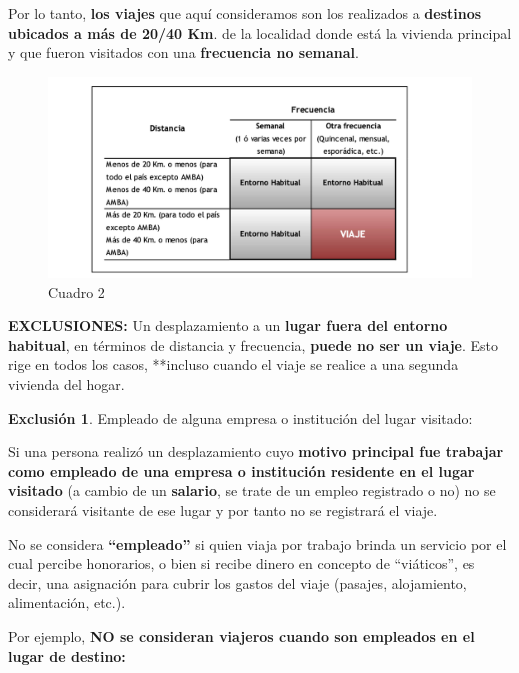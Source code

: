 \documentclass[
  openany]{book}
\begin{document}
Por lo tanto, \textbf{los viajes} que aquí consideramos son los realizados a \textbf{destinos ubicados a más de 20/40 Km}. de la localidad donde está la vivienda principal y que fueron visitados con una \textbf{frecuencia no semanal}.

\begin{figure}

{\centering \includegraphics[width=1\linewidth]{imagenes/figura6-22} 

}

\caption{Cuadro 2}\label{fig:Cuadro}
\end{figure}

\textbf{EXCLUSIONES:} Un desplazamiento a un \textbf{lugar fuera del entorno habitual}, en términos de distancia y frecuencia, \textbf{puede no ser un viaje}. Esto rige en todos los casos, **incluso cuando el viaje se realice a una segunda vivienda del hogar.

\textbf{Exclusión 1}. Empleado de alguna empresa o institución del lugar visitado:

Si una persona realizó un desplazamiento cuyo \textbf{motivo principal fue trabajar como empleado de una empresa o institución residente en el lugar visitado} (a cambio de un \textbf{salario}, se trate de un empleo registrado o no) no se considerará visitante de ese lugar y por tanto no se registrará el viaje.

No se considera \textbf{``empleado''} si quien viaja por trabajo brinda un servicio por el cual percibe honorarios, o bien si recibe dinero en concepto de ``viáticos'', es decir, una asignación para cubrir los gastos del viaje (pasajes, alojamiento, alimentación, etc.).

Por ejemplo, \textbf{NO se consideran viajeros cuando son empleados en el lugar de destino:}
\end{document}
